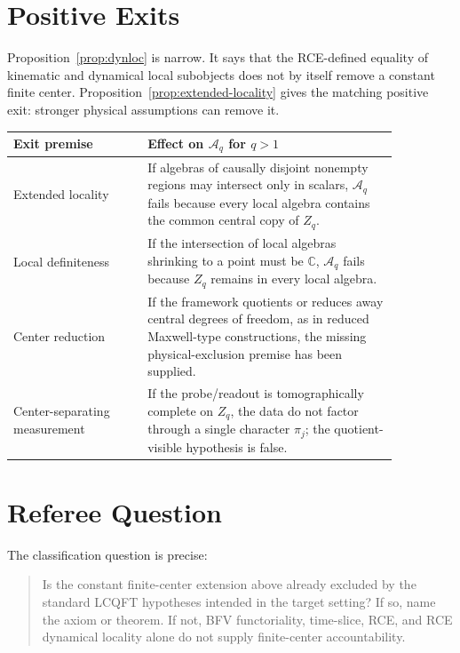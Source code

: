 \documentclass[12pt]{article}
\theoremstyle{remark}
\newcommand{\A}{\mathcal A}
\newcommand{\C}{\mathbb C}
\begin{document}
\section{Positive Exits}

Proposition~\ref{prop:dynloc} is narrow.  It says that the RCE-defined equality
of kinematic and dynamical local subobjects does not by itself remove a
constant finite center.  Proposition~\ref{prop:extended-locality} gives the
matching positive exit: stronger physical assumptions can remove it.

\begin{center}
\begin{tabular}{>{\raggedright\arraybackslash}p{0.30\linewidth}>{\raggedright\arraybackslash}p{0.56\linewidth}}
\toprule
Exit premise & Effect on \(\A_q\) for \(q>1\) \\
\midrule
Extended locality & If algebras of causally disjoint nonempty regions may
intersect only in scalars, \(\A_q\) fails because every local algebra contains
the common central copy of \(Z_q\). \\
\addlinespace
Local definiteness & If the intersection of local algebras shrinking to a
point must be \(\C\), \(\A_q\) fails because \(Z_q\) remains in every local
algebra. \\
\addlinespace
Center reduction & If the framework quotients or reduces away central
degrees of freedom, as in reduced Maxwell-type constructions, the missing
physical-exclusion premise has been supplied. \\
\addlinespace
Center-separating measurement & If the probe/readout is tomographically
complete on \(Z_q\), the data do not factor through a single character
\(\pi_j\); the quotient-visible hypothesis is false. \\
\bottomrule
\end{tabular}
\end{center}

\section{Referee Question}

The classification question is precise:

\begin{quote}
Is the constant finite-center extension above already excluded by the standard
LCQFT hypotheses intended in the target setting?  If so, name the axiom or
theorem.  If not, BFV functoriality, time-slice, RCE, and RCE dynamical
locality alone do not supply finite-center accountability.
\end{quote}
\end{document}
